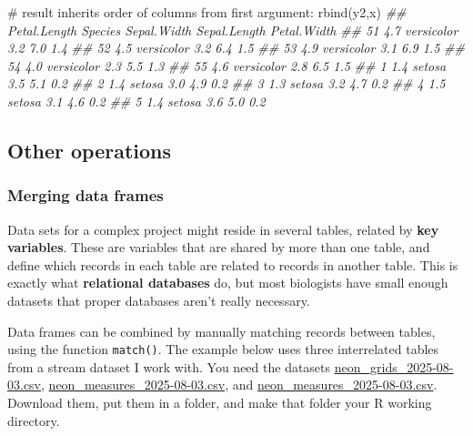 \documentclass[
  13,
  letterpaper,
]{report}
\newenvironment{Shaded}{\begin{snugshade}}{\end{snugshade}}
\newcommand{\CommentTok}[1]{\textcolor[rgb]{0.37,0.37,0.37}{#1}}
\newcommand{\DocumentationTok}[1]{\textcolor[rgb]{0.37,0.37,0.37}{\textit{#1}}}
\newcommand{\FunctionTok}[1]{\textcolor[rgb]{0.28,0.35,0.67}{#1}}
\newcommand{\NormalTok}[1]{\textcolor[rgb]{0.00,0.23,0.31}{#1}}
\begin{document}
\begin{Shaded}
\begin{Highlighting}[]
\CommentTok{\# result inherits order of columns from first argument:}
\FunctionTok{rbind}\NormalTok{(y2,x)}
\DocumentationTok{\#\#    Petal.Length    Species Sepal.Width Sepal.Length Petal.Width}
\DocumentationTok{\#\# 51          4.7 versicolor         3.2          7.0         1.4}
\DocumentationTok{\#\# 52          4.5 versicolor         3.2          6.4         1.5}
\DocumentationTok{\#\# 53          4.9 versicolor         3.1          6.9         1.5}
\DocumentationTok{\#\# 54          4.0 versicolor         2.3          5.5         1.3}
\DocumentationTok{\#\# 55          4.6 versicolor         2.8          6.5         1.5}
\DocumentationTok{\#\# 1           1.4     setosa         3.5          5.1         0.2}
\DocumentationTok{\#\# 2           1.4     setosa         3.0          4.9         0.2}
\DocumentationTok{\#\# 3           1.3     setosa         3.2          4.7         0.2}
\DocumentationTok{\#\# 4           1.5     setosa         3.1          4.6         0.2}
\DocumentationTok{\#\# 5           1.4     setosa         3.6          5.0         0.2}
\end{Highlighting}
\end{Shaded}

\subsection{Other operations}\label{sec-manip-df-oth}

\subsubsection{Merging data frames}\label{sec-manip-df-oth-merg}

Data sets for a complex project might reside in several tables, related
by \textbf{key variables}. These are variables that are shared by more
than one table, and define which records in each table are related to
records in another table. This is exactly what \textbf{relational
databases} do, but most biologists have small enough datasets that
proper databases aren't really necessary.

Data frames can be combined by manually matching records between tables,
using the function \texttt{match()}. The example below uses three
interrelated tables from a stream dataset I work with. You need the
datasets
\href{../datasets/neon_grids_2025-08-03.csv}{neon\_grids\_2025-08-03.csv},
\href{../datasets/neon_measures_2025-08-03.csv}{neon\_measures\_2025-08-03.csv},
and
\href{../datasets/neon_measures_2025-08-03.csv}{neon\_measures\_2025-08-03.csv}.
Download them, put them in a folder, and make that folder your R working
directory.
\end{document}
